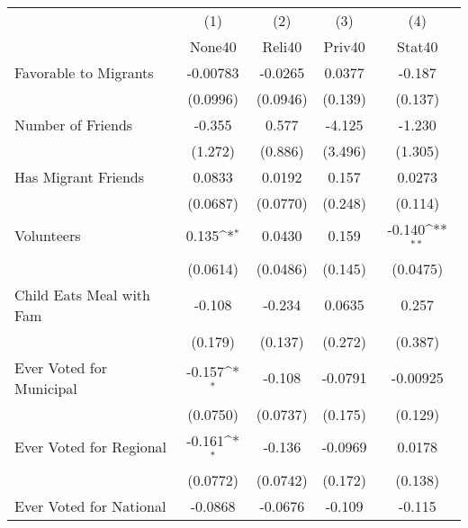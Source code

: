 {
\def\sym#1{\ifmmode^{#1}\else\(^{#1}\)\fi}
\begin{tabular}{l*{4}{c}}
\hline\hline
            &\multicolumn{1}{c}{(1)}&\multicolumn{1}{c}{(2)}&\multicolumn{1}{c}{(3)}&\multicolumn{1}{c}{(4)}\\
            &\multicolumn{1}{c}{None40}&\multicolumn{1}{c}{Reli40}&\multicolumn{1}{c}{Priv40}&\multicolumn{1}{c}{Stat40}\\
\hline
Favorable to Migrants&    -0.00783         &     -0.0265         &      0.0377         &      -0.187         \\
            &    (0.0996)         &    (0.0946)         &     (0.139)         &     (0.137)         \\
[1em]
Number of Friends&      -0.355         &       0.577         &      -4.125         &      -1.230         \\
            &     (1.272)         &     (0.886)         &     (3.496)         &     (1.305)         \\
[1em]
Has Migrant Friends&      0.0833         &      0.0192         &       0.157         &      0.0273         \\
            &    (0.0687)         &    (0.0770)         &     (0.248)         &     (0.114)         \\
[1em]
Volunteers  &       0.135\sym{*}  &      0.0430         &       0.159         &      -0.140\sym{**} \\
            &    (0.0614)         &    (0.0486)         &     (0.145)         &    (0.0475)         \\
[1em]
Child Eats Meal with Fam&      -0.108         &      -0.234         &      0.0635         &       0.257         \\
            &     (0.179)         &     (0.137)         &     (0.272)         &     (0.387)         \\
[1em]
Ever Voted for Municipal&      -0.157\sym{*}  &      -0.108         &     -0.0791         &    -0.00925         \\
            &    (0.0750)         &    (0.0737)         &     (0.175)         &     (0.129)         \\
[1em]
Ever Voted for Regional&      -0.161\sym{*}  &      -0.136         &     -0.0969         &      0.0178         \\
            &    (0.0772)         &    (0.0742)         &     (0.172)         &     (0.138)         \\
[1em]
Ever Voted for National&     -0.0868         &     -0.0676         &      -0.109         &      -0.115         \\

\end{tabular}}
